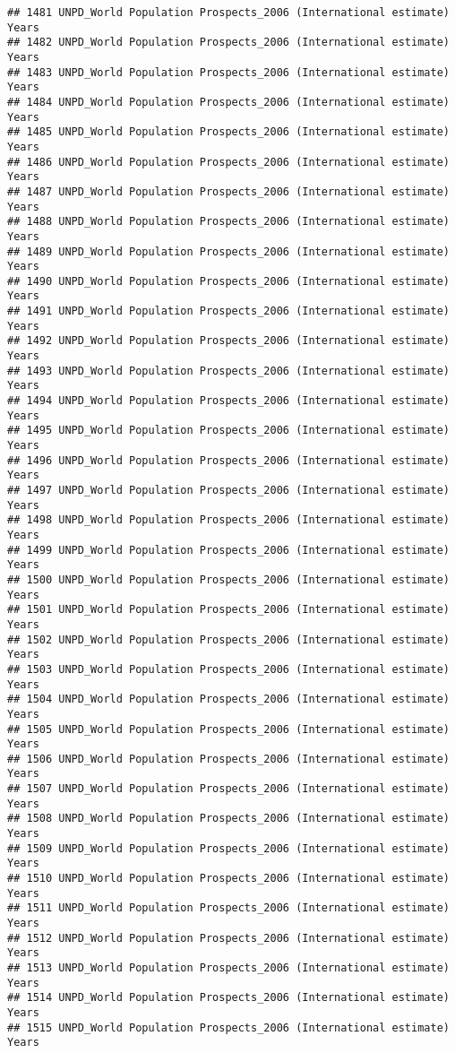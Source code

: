 \documentclass[]{article}
\begin{document}
\begin{verbatim}
## 1481 UNPD_World Population Prospects_2006 (International estimate) Years
## 1482 UNPD_World Population Prospects_2006 (International estimate) Years
## 1483 UNPD_World Population Prospects_2006 (International estimate) Years
## 1484 UNPD_World Population Prospects_2006 (International estimate) Years
## 1485 UNPD_World Population Prospects_2006 (International estimate) Years
## 1486 UNPD_World Population Prospects_2006 (International estimate) Years
## 1487 UNPD_World Population Prospects_2006 (International estimate) Years
## 1488 UNPD_World Population Prospects_2006 (International estimate) Years
## 1489 UNPD_World Population Prospects_2006 (International estimate) Years
## 1490 UNPD_World Population Prospects_2006 (International estimate) Years
## 1491 UNPD_World Population Prospects_2006 (International estimate) Years
## 1492 UNPD_World Population Prospects_2006 (International estimate) Years
## 1493 UNPD_World Population Prospects_2006 (International estimate) Years
## 1494 UNPD_World Population Prospects_2006 (International estimate) Years
## 1495 UNPD_World Population Prospects_2006 (International estimate) Years
## 1496 UNPD_World Population Prospects_2006 (International estimate) Years
## 1497 UNPD_World Population Prospects_2006 (International estimate) Years
## 1498 UNPD_World Population Prospects_2006 (International estimate) Years
## 1499 UNPD_World Population Prospects_2006 (International estimate) Years
## 1500 UNPD_World Population Prospects_2006 (International estimate) Years
## 1501 UNPD_World Population Prospects_2006 (International estimate) Years
## 1502 UNPD_World Population Prospects_2006 (International estimate) Years
## 1503 UNPD_World Population Prospects_2006 (International estimate) Years
## 1504 UNPD_World Population Prospects_2006 (International estimate) Years
## 1505 UNPD_World Population Prospects_2006 (International estimate) Years
## 1506 UNPD_World Population Prospects_2006 (International estimate) Years
## 1507 UNPD_World Population Prospects_2006 (International estimate) Years
## 1508 UNPD_World Population Prospects_2006 (International estimate) Years
## 1509 UNPD_World Population Prospects_2006 (International estimate) Years
## 1510 UNPD_World Population Prospects_2006 (International estimate) Years
## 1511 UNPD_World Population Prospects_2006 (International estimate) Years
## 1512 UNPD_World Population Prospects_2006 (International estimate) Years
## 1513 UNPD_World Population Prospects_2006 (International estimate) Years
## 1514 UNPD_World Population Prospects_2006 (International estimate) Years
## 1515 UNPD_World Population Prospects_2006 (International estimate) Years

\end{verbatim}
\end{document}

